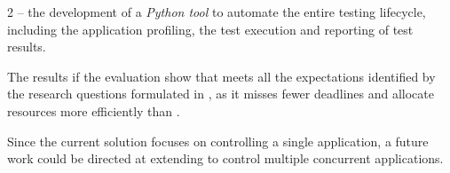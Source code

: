 2 -- the development of a \textit{Python tool} to automate the entire testing lifecycle, including the application profiling, the test execution and reporting of test results. 

The results if the evaluation show that \tool meets all the expectations identified by the research questions formulated in , as it misses fewer deadlines and allocate resources more efficiently than \cSpark. 

 
Since the current solution focuses on controlling a single application, a future work could be directed at extending \tool to control multiple concurrent applications.

